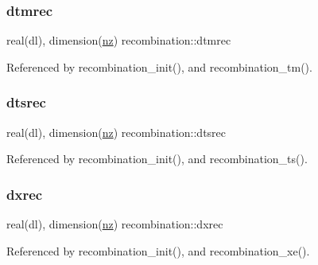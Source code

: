\subsubsection{\texorpdfstring{dtmrec}{dtmrec}}
{\footnotesize\ttfamily real(dl), dimension(\mbox{\hyperlink{namespacerecombination_a2ebf98b22953bfe18fb372dd8e330d3e}{nz}}) recombination\+::dtmrec\hspace{0.3cm}{\ttfamily [private]}}



Referenced by recombination\+\_\+init(), and recombination\+\_\+tm().

\mbox{\label{namespacerecombination_a05ee59d76dcf3b0345da845ed7980073}} 
\subsubsection{\texorpdfstring{dtsrec}{dtsrec}}
{\footnotesize\ttfamily real(dl), dimension(\mbox{\hyperlink{namespacerecombination_a2ebf98b22953bfe18fb372dd8e330d3e}{nz}}) recombination\+::dtsrec\hspace{0.3cm}{\ttfamily [private]}}



Referenced by recombination\+\_\+init(), and recombination\+\_\+ts().

\mbox{\label{namespacerecombination_a34b4e0fe310c9f5d1705a2e78983d9fa}} 
\subsubsection{\texorpdfstring{dxrec}{dxrec}}
{\footnotesize\ttfamily real(dl), dimension(\mbox{\hyperlink{namespacerecombination_a2ebf98b22953bfe18fb372dd8e330d3e}{nz}}) recombination\+::dxrec\hspace{0.3cm}{\ttfamily [private]}}



Referenced by recombination\+\_\+init(), and recombination\+\_\+xe().

\mbox{\label{namespacerecombination_ab91e25d9cc8fed5d1aa39540e9f90c59}} 
